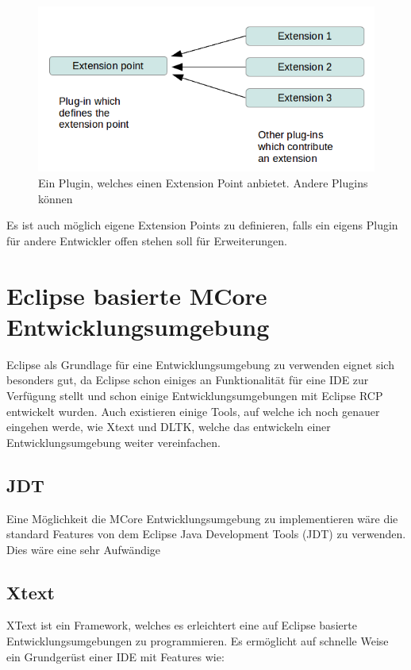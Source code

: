 \begin{figure}[H]
	\centering
		\includegraphics[scale=0.5]{platform/extensionpoint.png}
		\caption{Ein Plugin, welches einen Extension Point anbietet. Andere Plugins können}
		\label{fig:extensionpoint}
\end{figure}

Es ist auch möglich eigene Extension Points zu definieren, falls ein eigens Plugin für andere Entwickler offen stehen soll für Erweiterungen.

\section{Eclipse basierte MCore Entwicklungsumgebung}

Eclipse als Grundlage für eine Entwicklungsumgebung zu verwenden eignet sich besonders gut, da Eclipse schon einiges an Funktionalität für eine IDE zur Verfügung stellt und schon einige Entwicklungsumgebungen mit Eclipse RCP entwickelt wurden. Auch existieren einige Tools, auf welche ich noch genauer eingehen werde, wie Xtext und DLTK, welche das entwickeln einer Entwicklungsumgebung weiter vereinfachen.

\subsection{JDT}
Eine Möglichkeit die MCore Entwicklungsumgebung zu implementieren wäre die standard Features von dem Eclipse Java Development Tools (JDT) zu verwenden. Dies wäre eine sehr Aufwändige 

\subsection{Xtext}
XText ist ein Framework, welches es erleichtert eine auf Eclipse basierte Entwicklungsumgebungen zu programmieren. Es ermöglicht auf schnelle Weise ein Grundgerüst einer IDE mit Features wie:

